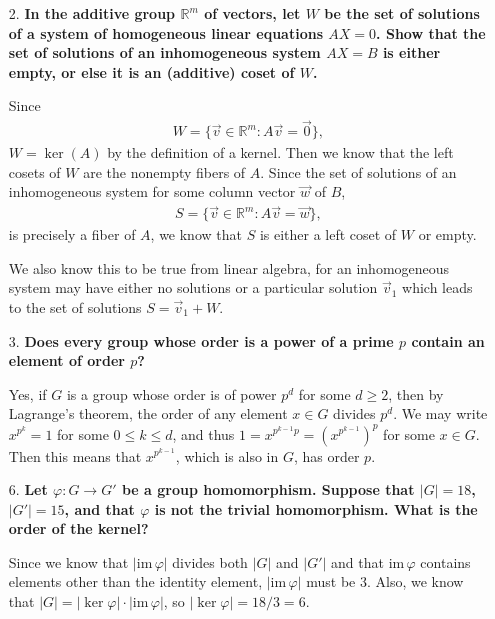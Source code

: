 \documentclass[a4paper,12pt]{article}
\newcommand{\im}{\text{im}\,}
\begin{document}
\begin{enumerate}
    \item[2.]
        \boldmath
        \textbf{In the additive group $\mathbb{R}^m$ of vectors, let $W$ be the set of solutions of a system of homogeneous linear equations $AX = 0$. Show that the set of solutions of an inhomogeneous system $AX = B$ is either empty, or else it is an (additive) coset of $W$.} \par
        \unboldmath
        Since
        \begin{align*}
            W = \{ \vec{v} \in \mathbb{R}^m : A\vec{v} = \vec{0} \},
        \end{align*}
        $W = \ker(A)$ by the definition of a kernel. Then we know that the left cosets of $W$ are the nonempty fibers of $A$. Since the set of solutions of an inhomogeneous system for some column vector $\vec{w}$ of $B$,
        \begin{align*}
            S = \{ \vec{v} \in \mathbb{R}^m : A\vec{v} = \vec{w} \},
        \end{align*}
        is precisely a fiber of $A$, we know that $S$ is either a left coset of $W$ or empty. \par
        We also know this to be true from linear algebra, for an inhomogeneous system may have either no solutions or a particular solution $\vec{v}_1$ which leads to the set of solutions $S = \vec{v}_1 + W$.

    \item[3.]
        \boldmath
        \textbf{Does every group whose order is a power of a prime $p$ contain an element of order $p$?} \par
        \unboldmath
        Yes, if $G$ is a group whose order is of power $p^d$ for some $d \geq 2$, then by Lagrange's theorem, the order of any element $x \in G$ divides $p^d$. We may write $x^{p^k} = 1$ for some $0 \leq k \leq d$, and thus $1 = x^{p^{k - 1} p} = ( x^{p^{k - 1}} )^p$ for some $x \in G$. Then this means that $x^{p^{k - 1}}$, which is also in $G$, has order $p$.

    \item[6.]
        \boldmath
        \textbf{Let $\varphi : G \to G'$ be a group homomorphism. Suppose that $|G| = 18$, $|G'| = 15$, and that $\varphi$ is not the trivial homomorphism. What is the order of the kernel?} \par
        \unboldmath
        Since we know that $|\im \varphi|$ divides both $|G|$ and $|G'|$ and that $\im \varphi$ contains elements other than the identity element, $|\im \varphi|$ must be $3$. Also, we know that $|G| = |\ker \varphi| \cdot |\im \varphi|$, so $|\ker \varphi| = 18/3 = 6$.


\end{enumerate}
\end{document}
